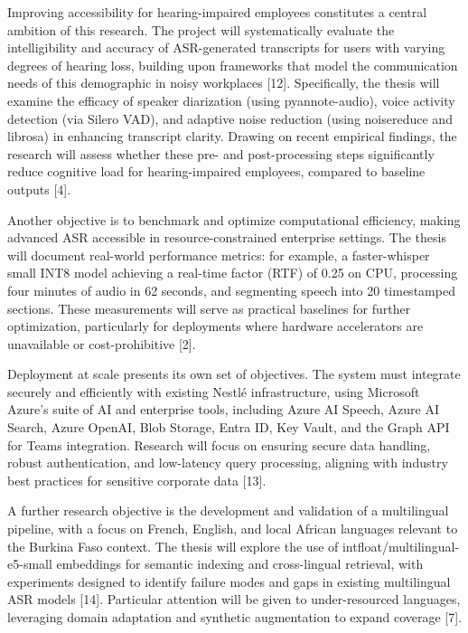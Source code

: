 \documentclass[12pt,a4paper]{article}
\begin{document}
Improving accessibility for hearing-impaired employees constitutes a central ambition of this research. The project will systematically evaluate the intelligibility and accuracy of ASR-generated transcripts for users with varying degrees of hearing loss, building upon frameworks that model the communication needs of this demographic in noisy workplaces [12]. Specifically, the thesis will examine the efficacy of speaker diarization (using pyannote-audio), voice activity detection (via Silero VAD), and adaptive noise reduction (using noisereduce and librosa) in enhancing transcript clarity. Drawing on recent empirical findings, the research will assess whether these pre- and post-processing steps significantly reduce cognitive load for hearing-impaired employees, compared to baseline outputs [4].


Another objective is to benchmark and optimize computational efficiency, making advanced ASR accessible in resource-constrained enterprise settings. The thesis will document real-world performance metrics: for example, a faster-whisper small INT8 model achieving a real-time factor (RTF) of 0.25 on CPU, processing four minutes of audio in 62 seconds, and segmenting speech into 20 timestamped sections. These measurements will serve as practical baselines for further optimization, particularly for deployments where hardware accelerators are unavailable or cost-prohibitive [2].


Deployment at scale presents its own set of objectives. The system must integrate securely and efficiently with existing Nestlé infrastructure, using Microsoft Azure’s suite of AI and enterprise tools, including Azure AI Speech, Azure AI Search, Azure OpenAI, Blob Storage, Entra ID, Key Vault, and the Graph API for Teams integration. Research will focus on ensuring secure data handling, robust authentication, and low-latency query processing, aligning with industry best practices for sensitive corporate data [13].


A further research objective is the development and validation of a multilingual pipeline, with a focus on French, English, and local African languages relevant to the Burkina Faso context. The thesis will explore the use of intfloat/multilingual-e5-small embeddings for semantic indexing and cross-lingual retrieval, with experiments designed to identify failure modes and gaps in existing multilingual ASR models [14]. Particular attention will be given to under-resourced languages, leveraging domain adaptation and synthetic augmentation to expand coverage [7].
\end{document}
